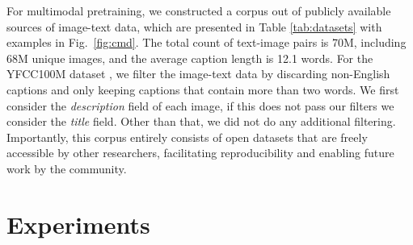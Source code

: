 \documentclass[10pt,twocolumn,letterpaper]{article}
\newcommand{\CMD}{PMD\xspace}
\begin{document}
\begin{table}[t]
\small
{}
\vspace{-0.5em}
\caption{Public Multimodal Datasets (\CMD) corpus used in FLAVA multimodal pretraining, which consists of publicly available datasets with a total size of 70M image and text pairs.}
\label{tab:datasets}
\vspace{-1em}
\end{table}

For multimodal pretraining, we constructed a corpus out of publicly available sources of image-text data, which are presented in Table \ref{tab:datasets} with examples in Fig.~\ref{fig:cmd}. The total count of text-image pairs is 70M, including 68M unique images, and the average caption length is 12.1 words. For the YFCC100M dataset \cite{yfcc100m}, we filter the image-text data by discarding non-English captions and only keeping captions that contain more than two words. We first consider the \textit{description} field of each image, if this does not pass our filters we consider the \textit{title} field. Other than that, we did not do any additional filtering. Importantly, this corpus entirely consists of open datasets that are freely accessible by other researchers, facilitating reproducibility and enabling future work by the community.

\section{Experiments}
\end{document}
